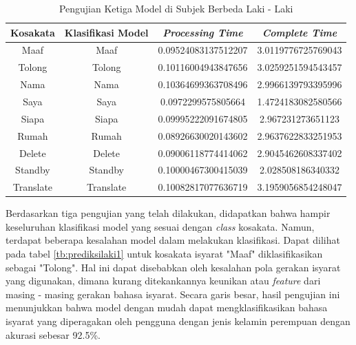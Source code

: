 \newpage
\begin{longtable}{|c|c|c|c|}
  \caption{Pengujian Ketiga Model di Subjek Berbeda Laki - Laki}
  \label{tb:prediksilaki3}                                   \\
  \hline
  \rowcolor[HTML]{C0C0C0}
  \textbf{Kosakata} & \textbf{Klasifikasi Model} & \textbf{\emph{Processing Time}} & \textbf{\emph{Complete Time}}\\
  \hline
  Maaf              & Maaf                        & 0.09524083137512207                           & 3.0119776725769043                                  \\
  Tolong            & Tolong                        & 0.10116004943847656                           & 3.0259251594543457                                  \\
  Nama              & Nama                        & 0.10364699363708496                           & 2.9966139793395996                                  \\
  Saya              & Saya                        & 0.0972299575805664                           & 1.4724183082580566                                  \\
  Siapa              & Siapa                        & 0.09995222091674805                           & 2.967231273651123                                  \\
  Rumah             & Rumah                        & 0.08926630020143602                           & 2.9637622833251953                                  \\
  Delete            & Delete                        & 0.09006118774414062                           & 2.9045462608337402                                  \\
  Standby           & Standby                        & 0.10000467300415039                           & 2.028508186340332                                  \\
  Translate         & Translate                        & 0.10082817077636719                           & 3.1959056854248047                                  \\
  \hline
\end{longtable}

Berdasarkan tiga pengujian yang telah dilakukan, didapatkan bahwa hampir keseluruhan klasifikasi model yang sesuai dengan \emph{class} kosakata. Namun, terdapat beberapa kesalahan model dalam melakukan klasifikasi. Dapat dilihat pada tabel \ref{tb:prediksilaki1} untuk kosakata isyarat "Maaf" diklasifikasikan sebagai "Tolong". Hal ini dapat disebabkan oleh kesalahan pola gerakan isyarat yang digunakan, dimana kurang ditekankannya keunikan atau \emph{feature} dari masing - masing gerakan bahasa isyarat.  Secara garis besar, hasil pengujian ini menunjukkan bahwa model dengan mudah dapat mengklasifikasikan bahasa isyarat yang diperagakan oleh pengguna dengan jenis kelamin perempuan dengan akurasi sebesar 92.5\%. 


